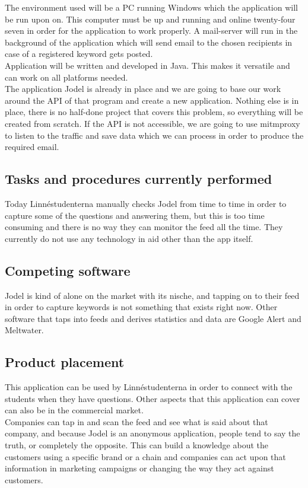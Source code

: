 \documentclass[a4paper,12pt]{article}
\begin{document}
The environment used will be a PC running Windows which the application will be run upon on. This computer must be up and running and online twenty-four seven in order for the application to work properly. A mail-server will run in the background of the application which will send email to the chosen recipients in case of a registered keyword gets posted.\\
Application will be written and developed in Java. This makes it versatile and can work on all platforms needed.
\\The application Jodel is already in place and we are going to base our work around the API of that program and create a new application. Nothing else is in place, there is no half-done project that covers this problem, so everything will be created from scratch.
If the API is not accessible, we are going to use mitmproxy to listen to the traffic and save data which we can process in order to produce the required email.
\subsection{Tasks and procedures currently performed}
Today Linnéstudenterna manually checks Jodel from time to time in order to capture some of the questions and answering them, but this is too time consuming and there is no way they can monitor the feed all the time. They currently do not use any technology in aid other than the app itself.
\subsection{Competing software}
Jodel is kind of alone on the market with its nische, and tapping on to their feed in order to capture keywords is not something that exists right now.
Other software that taps into feeds and derives statistics and data are Google Alert and Meltwater.
\subsection{Product placement}
This application can be used by Linnéstudenterna in order to connect with the students when they have questions. Other aspects that this application can cover can also be in the commercial market. \\
Companies can tap in and scan the feed and see what is said about that company, and because Jodel is an anonymous application, people tend to say the truth, or completely the opposite. This can build a knowledge about the customers using a specific brand or a chain and companies can act upon that information in marketing campaigns or changing the way they act against customers.
\end{document}
